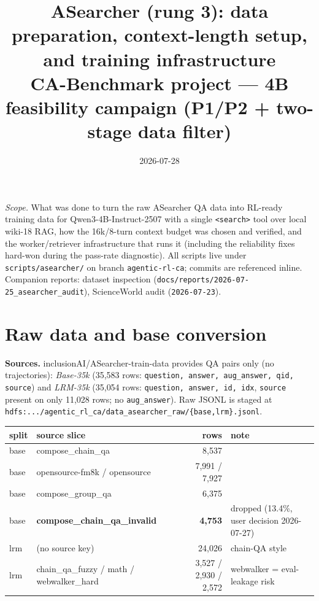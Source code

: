 \documentclass[10pt]{article}
\title{\vspace{-1.5cm}\textbf{ASearcher (rung 3): data preparation, context-length setup,\\ and training infrastructure}\\[2pt]
\large CA-Benchmark project --- 4B feasibility campaign (P1/P2 + two-stage data filter)}
\author{}
\date{2026-07-28}
\newcommand{\cmd}[1]{\texttt{\small #1}}
\begin{document}
\maketitle
\vspace{-0.6cm}

\noindent\small\textit{Scope.} What was done to turn the raw ASearcher QA data into RL-ready training
data for Qwen3-4B-Instruct-2507 with a single \cmd{<search>} tool over local wiki-18 RAG, how the
16k/8-turn context budget was chosen and verified, and the worker/retriever infrastructure that runs it
(including the reliability fixes hard-won during the pass-rate diagnostic). All scripts live under
\cmd{scripts/asearcher/} on branch \cmd{agentic-rl-ca}; commits are referenced inline. Companion
reports: dataset inspection (\cmd{docs/reports/2026-07-25\_asearcher\_audit}), ScienceWorld audit
(\cmd{2026-07-23}).\normalsize

\section{Raw data and base conversion}
\textbf{Sources.} inclusionAI/ASearcher-train-data provides QA pairs only (no trajectories):
\emph{Base-35k} (35{,}583 rows: \cmd{question, answer, aug\_answer, qid, source}) and \emph{LRM-35k}
(35{,}054 rows: \cmd{question, answer, id, idx}, \cmd{source} present on only 11{,}028 rows; no
\cmd{aug\_answer}). Raw JSONL is staged at
\cmd{hdfs:.../agentic\_rl\_ca/data\_asearcher\_raw/\{base,lrm\}.jsonl}.

\begin{center}\small
\begin{tabular}{@{}llrl@{}}
\toprule
split & source slice & rows & note \\
\midrule
base & compose\_chain\_qa & 8{,}537 & \\
base & opensource-fm8k / opensource & 7{,}991 / 7{,}927 & \\
base & compose\_group\_qa & 6{,}375 & \\
base & \textbf{compose\_chain\_qa\_invalid} & \textbf{4{,}753} & dropped (13.4\%, user decision 2026-07-27) \\
lrm & (no source key) & 24{,}026 & chain-QA style \\
lrm & chain\_qa\_fuzzy / math / webwalker\_hard & 3{,}527 / 2{,}930 / 2{,}572 & webwalker = eval-leakage risk \\
\bottomrule
\end{tabular}
\end{center}
\end{document}

